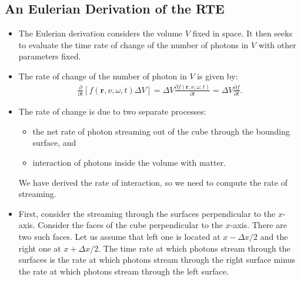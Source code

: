 \documentclass[10pt]{article}
\newcommand{\ve}[1]{\mathbf{#1}}
\begin{document}
  \subsection{An Eulerian Derivation of the RTE}
  \begin{itemize}
    \item The Eulerian derivation considers the volume $V$ fixed in space. It then seeks to evaluate the time rate of change of the number of photons in $V$ with other parameters fixed.

    \item The rate of change of the number of photon in $V$ is given by:
    \begin{align*}
      \frac{\partial}{\partial t} [f(\ve{r}, \nu, \omega, t) \Delta V]
      = \Delta V \frac{\partial f(\ve{r}, \nu, \omega, t)}{\partial t}
      = \Delta V \frac{\partial f}{\partial t}.
    \end{align*}    

    \item The rate of change is due to two separate processes:
    \begin{itemize}
      \item the net rate of photon streaming out of the cube through the bounding surface, and
      \item interaction of photons inside the volume with matter.
    \end{itemize}
    We have derived the rate of interaction, so we need to compute the rate of streaming.

    \item First, consider the streaming through the surfaces perpendicular to the $x$-axis. Consider the faces of the cube perpendicular to the $x$-axis. There are two such faces. Let us assume that left one is located at $x - \Delta x /2$ and the right one at $x + \Delta x /2$. The time rate at which photons stream through the surfaces is the rate at which photons stream through the right surface minus the rate at which photons stream through the left surface.


\end{itemize}
\end{document}
